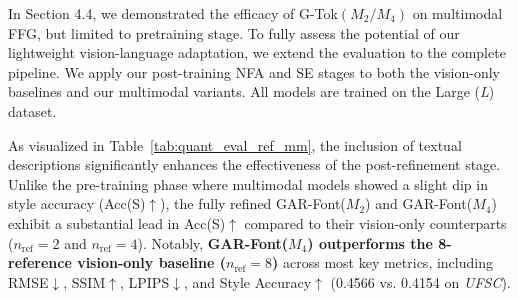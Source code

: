 \begin{table}[!t]
\centering
\caption{Quantitative evaluation of G-Tok's architecture on Unseen Fonts. All models listed are pre-trained on the Small dataset.}
\vspace{-2mm}
\setlength{\tabcolsep}{3pt}
\renewcommand{\arraystretch}{1.05}
\label{tab:ablation_gtok_generator}
\end{table}

In Section 4.4, we demonstrated the efficacy of G-Tok$(M_2/M_4)$ on multimodal FFG, but limited to pretraining stage. To fully assess the potential of our lightweight vision-language adaptation, we extend the evaluation to the complete pipeline. We apply our post-training NFA and SE stages to both the vision-only baselines and our multimodal variants. All models are trained on the Large (\textit{L}) dataset.

As visualized in Table~\ref{tab:quant_eval_ref_mm}, the inclusion of textual descriptions significantly enhances the effectiveness of the post-refinement stage. Unlike the pre-training phase where multimodal models showed a slight dip in style accuracy (Acc(S)$\uparrow$), the fully refined GAR-Font($M_2$) and GAR-Font($M_4$) exhibit a substantial lead in Acc(S)$\uparrow$ compared to their vision-only counterparts ($n_\text{ref}=2$ and $n_\text{ref}=4$). Notably, \textbf{GAR-Font($M_4$) outperforms the 8-reference vision-only baseline ($n_\text{ref}=8$)} across most key metrics, including RMSE$\downarrow$, SSIM$\uparrow$, LPIPS$\downarrow$, and Style Accuracy$\uparrow$ (0.4566 vs. 0.4154 on \textit{UFSC}).


